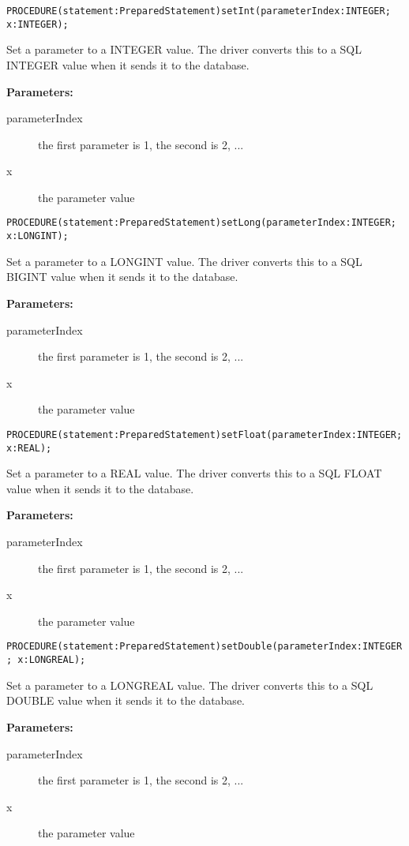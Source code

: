\verb'PROCEDURE(statement:PreparedStatement)setInt(parameterIndex:INTEGER; x:INTEGER);'

Set a parameter to a INTEGER value. The driver converts this to a SQL INTEGER value when it sends it to the database. 

{\bf Parameters: }
\begin{description}
\item[parameterIndex] the first parameter is 1, the second is 2, ... 
\item[x] the parameter value 
\end{description}



\verb'PROCEDURE(statement:PreparedStatement)setLong(parameterIndex:INTEGER; x:LONGINT);'

Set a parameter to a LONGINT value. The driver converts this to a SQL BIGINT value when it sends it to the database. 

{\bf Parameters: }
\begin{description}
\item[parameterIndex] the first parameter is 1, the second is 2, ... 
\item[x] the parameter value 
\end{description}



\verb'PROCEDURE(statement:PreparedStatement)setFloat(parameterIndex:INTEGER; x:REAL);'

Set a parameter to a REAL value. The driver converts this to a SQL FLOAT value when it sends it to the database. 

{\bf Parameters: }
\begin{description}
\item[parameterIndex] the first parameter is 1, the second is 2, ... 
\item[x] the parameter value 
\end{description}



\verb'PROCEDURE(statement:PreparedStatement)setDouble(parameterIndex:INTEGER; x:LONGREAL);'

Set a parameter to a LONGREAL value. The driver converts this to a SQL DOUBLE value when it sends it to the database. 

{\bf Parameters: }
\begin{description}
\item[parameterIndex] the first parameter is 1, the second is 2, ... 
\item[x] the parameter value 
\end{description}


